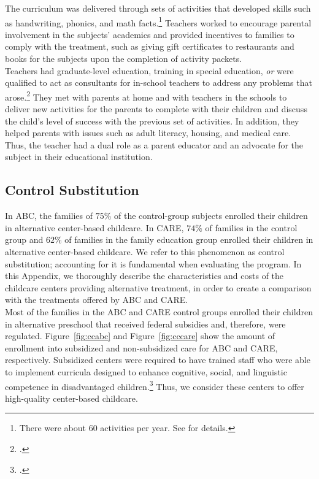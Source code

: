 \noindent The curriculum was delivered through sets of activities that developed skills such as handwriting, phonics, and math facts.\footnote{There were about 60 activities per year. See \cite{Campbell-Ramey_1989_Preschool-vs-School-age} for details.} Teachers worked to encourage parental involvement in the subjects' academics and provided incentives to families to comply with the treatment, such as giving gift certificates to restaurants and books for the subjects upon the completion of activity packets. \\

\noindent Teachers had graduate-level education, training in special education, \textit{or} were qualified to act as consultants for in-school teachers to address any problems that arose.\footnote{\cite{Ramey_Campbell_1991_childreninpoverty}.} They met with parents at home and with teachers in the schools to deliver new activities for the parents to complete with their children and discuss the child's level of success with the previous set of activities. In addition, they helped parents with issues such as adult literacy, housing, and medical care. Thus, the teacher had a dual role as a parent educator and an advocate for the subject in their educational institution.

\subsection{Control Substitution}\label{app:control-subbb}

\noindent In ABC, the families of $75\%$ of the control-group subjects enrolled their children in alternative center-based childcare. In CARE, $74\%$ of families in the control group and $62\%$ of families in the family education group enrolled their children in alternative center-based childcare. We refer to this phenomenon as control substitution; accounting for it is fundamental when evaluating the program. In this Appendix, we thoroughly describe the characteristics and costs of the childcare centers providing alternative treatment, in order to create a comparison with the treatments offered by ABC and CARE.\\

\noindent Most of the families in the ABC and CARE control groups enrolled their children in alternative preschool that received federal subsidies and, therefore, were regulated. Figure~\ref{fig:ccabc} and Figure~\ref{fig:cccare} show the amount of enrollment into subsidized and non-subsidized care for ABC and CARE, respectively. Subsidized centers were required to have trained staff who were able to implement curricula designed to enhance cognitive, social, and linguistic competence in disadvantaged children.\footnote{\citet{Burchinal_etal_1989_CD_Daycare-Pre-K-Dev}.} Thus, we consider these centers to offer high-quality center-based childcare.

